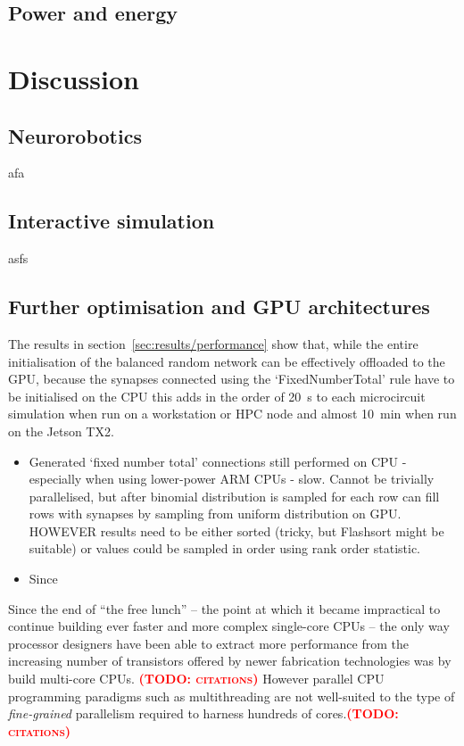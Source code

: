 \documentclass[utf8]{frontiersSCNS} %
\newcommand{\todo}[1]{\textbf{\textsc{\textcolor{red}{(TODO: #1)}}}}
\begin{document}
\subsection{Power and energy}

\section{Discussion}

\subsection{Neurorobotics}
afa

\subsection{Interactive simulation}
asfs

\subsection{Further optimisation and GPU architectures}
The results in section~\ref{sec:results/performance} show that, while the entire initialisation of the balanced random network can be effectively offloaded to the GPU, because the synapses connected using the `FixedNumberTotal' rule have to be initialised on the CPU this adds in the order of \SI{20}{\second} to each microcircuit simulation when run on a workstation or HPC node and almost \SI{10}{\minute} when run on the Jetson TX2.

\begin{itemize}
    \item Generated `fixed number total' connections still performed on CPU - especially when using lower-power ARM CPUs - slow. Cannot be trivially parallelised, but after binomial distribution is sampled for each row can fill rows with synapses by sampling from uniform distribution on GPU. HOWEVER results need to be either sorted (tricky, but Flashsort might be suitable) or values could be sampled in order using rank order statistic.
    \item Since
\end{itemize}
Since the end of ``the free lunch'' -- the point at which it became impractical to continue building ever faster and more complex single-core CPUs -- the only way processor designers have been able to extract more performance from the increasing number of transistors offered by newer fabrication technologies was by build multi-core CPUs. \todo{citations}
However parallel CPU programming paradigms such as multithreading are not well-suited to the type of \textit{fine-grained} parallelism required to harness hundreds of cores.\todo{citations}
\end{document}
